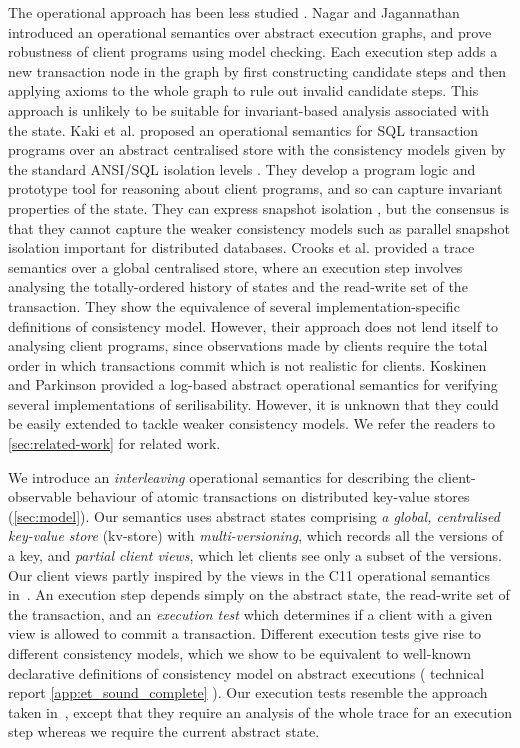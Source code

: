 The operational approach has been less studied \cite{sureshConcur,alonetogether,seebelieve,push-pull}.
Nagar and Jagannathan \citet{sureshConcur} introduced an operational semantics over abstract
execution graphs, and prove robustness of client programs using model
checking. Each execution step adds a new transaction node in the graph
by first constructing candidate steps and then applying axioms to the
whole graph to rule out invalid candidate steps.  This approach is
unlikely to be suitable for invariant-based analysis associated with
the state.  Kaki et al. \citet{alonetogether} proposed an operational semantics for
SQL transaction programs over an abstract centralised store with the consistency
models given by the standard ANSI/SQL isolation levels \cite{si}. They
develop a program logic and prototype tool for reasoning about client
programs, and so can capture invariant properties of the state. They can
express snapshot isolation \cite{si}, but the consensus is
that they cannot
capture the weaker consistency models such as parallel snapshot isolation \cite{PSI} 
important for distributed databases. 
Crooks et al. \citet{seebelieve} provided a trace semantics
over a global centralised store, where an execution step involves
analysing the totally-ordered
history of states and the read-write set of the transaction.
They show the equivalence of several
implementation-specific definitions of consistency model. However, their
approach does not lend itself to  analysing client programs,
since observations made by clients require the total order in
which transactions commit which is not realistic for clients. 
Koskinen and Parkinson \citet{push-pull}
provided a log-based abstract operational semantics for verifying several implementations of serilisability.
However, it is unknown that they could be easily extended to tackle weaker consistency models.
We refer the readers to \cref{sec:related-work} for related work.


We introduce an \emph{interleaving} operational semantics for
describing the client-observable behaviour of atomic transactions on
distributed key-value stores (\cref{sec:model}). Our semantics uses abstract states
comprising \emph{a global, centralised key-value store} (kv-store) with
\emph{multi-versioning}, which records all the versions of a key, and
\emph{partial client views}, which let clients see only a subset of the
versions.  Our client views partly inspired by the views in the C11
operational semantics in~\cite{promises}.  An execution step depends
simply on the abstract state, the read-write set of the transaction, and an \emph{execution test} which
determines if a client with a given view is allowed to commit a
transaction. Different execution tests give rise to different consistency models, 
which we show to be equivalent to well-known
declarative definitions of consistency model on abstract executions (%
\ifTechRepEdits%
technical report%
\else%
\cref{app:et_sound_complete}%
\fi%
).
Our execution tests resemble the  approach taken in~\cite{seebelieve},
except that they require an analysis of the whole trace for an
execution step whereas we require the current abstract state. 




